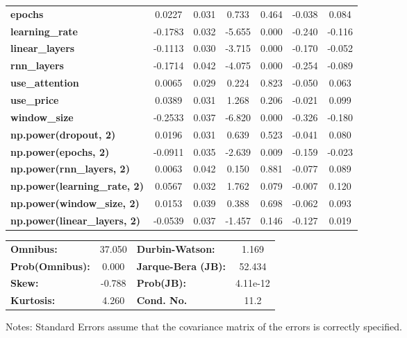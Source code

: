 \begin{center}
\begin{tabular}{lcccccc}
\textbf{epochs}                            &       0.0227  &        0.031     &     0.733  &         0.464        &       -0.038    &        0.084     \\
\textbf{learning\_rate}                    &      -0.1783  &        0.032     &    -5.655  &         0.000        &       -0.240    &       -0.116     \\
\textbf{linear\_layers}                    &      -0.1113  &        0.030     &    -3.715  &         0.000        &       -0.170    &       -0.052     \\
\textbf{rnn\_layers}                       &      -0.1714  &        0.042     &    -4.075  &         0.000        &       -0.254    &       -0.089     \\
\textbf{use\_attention}                    &       0.0065  &        0.029     &     0.224  &         0.823        &       -0.050    &        0.063     \\
\textbf{use\_price}                        &       0.0389  &        0.031     &     1.268  &         0.206        &       -0.021    &        0.099     \\
\textbf{window\_size}                      &      -0.2533  &        0.037     &    -6.820  &         0.000        &       -0.326    &       -0.180     \\
\textbf{np.power(dropout, 2)}              &       0.0196  &        0.031     &     0.639  &         0.523        &       -0.041    &        0.080     \\
\textbf{np.power(epochs, 2)}               &      -0.0911  &        0.035     &    -2.639  &         0.009        &       -0.159    &       -0.023     \\
\textbf{np.power(rnn\_layers, 2)}          &       0.0063  &        0.042     &     0.150  &         0.881        &       -0.077    &        0.089     \\
\textbf{np.power(learning\_rate, 2)}       &       0.0567  &        0.032     &     1.762  &         0.079        &       -0.007    &        0.120     \\
\textbf{np.power(window\_size, 2)}         &       0.0153  &        0.039     &     0.388  &         0.698        &       -0.062    &        0.093     \\
\textbf{np.power(linear\_layers, 2)}       &      -0.0539  &        0.037     &    -1.457  &         0.146        &       -0.127    &        0.019     \\
\bottomrule
\end{tabular}
\begin{tabular}{lclc}
\textbf{Omnibus:}       & 37.050 & \textbf{  Durbin-Watson:     } &    1.169  \\
\textbf{Prob(Omnibus):} &  0.000 & \textbf{  Jarque-Bera (JB):  } &   52.434  \\
\textbf{Skew:}          & -0.788 & \textbf{  Prob(JB):          } & 4.11e-12  \\
\textbf{Kurtosis:}      &  4.260 & \textbf{  Cond. No.          } &     11.2  \\
\bottomrule
\end{tabular}
\end{center}

Notes: \newline
 [1] Standard Errors assume that the covariance matrix of the errors is correctly specified.